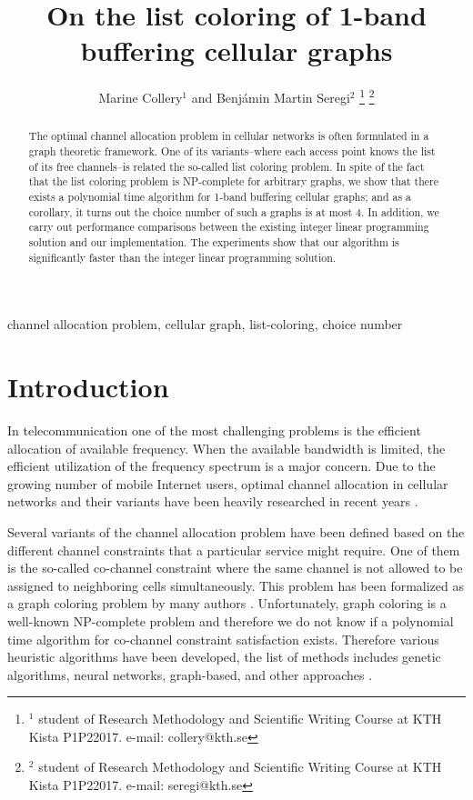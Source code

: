 \documentclass[letterpaper, 10 pt, conference]{ieeeconf}  %
\title{\LARGE \bf
On the list coloring of 1-band buffering cellular graphs
}
\author{Marine Collery$^{1}$ and Benjámin Martin Seregi$^{2}$%
\thanks{$^{1}$ student of Research Methodology and Scientific Writing Course at KTH Kista P1P22017. e-mail: collery@kth.se}%
\thanks{$^{2}$ student of Research Methodology and Scientific Writing Course at KTH Kista P1P22017. e-mail: seregi@kth.se}%
}
\begin{document}
\maketitle
\thispagestyle{firstpage}
\pagestyle{plain}
\cfoot{\thepage}

\begin{abstract}
The optimal channel allocation problem in cellular networks is often formulated in a graph theoretic framework. One of its variants\---where each access point knows the list of its free channels\---is related the so-called list coloring problem. In spite of the fact that the list coloring problem is NP-complete for arbitrary graphs, we show that there exists a polynomial time algorithm for 1-band buffering cellular graphs; and as a corollary, it turns out the choice number of such a graphs is at most 4. In addition, we carry out performance comparisons between the existing integer linear programming solution and our implementation. The experiments show that our algorithm is significantly faster than the integer linear programming solution.
\end{abstract}

\begin{keywords}
channel allocation problem, cellular graph, list-coloring, choice number
\end{keywords}

\section{Introduction}
In telecommunication one of the most challenging problems is the efficient allocation of available frequency. When the available bandwidth is limited, the efficient utilization of the frequency spectrum is a major concern. Due to the growing number of mobile Internet users, optimal channel allocation in cellular networks and their variants have been heavily researched in recent years \cite{Audhya:2011:SCA:1988563.1988571}.

Several variants of the channel allocation problem have been defined based on the different channel constraints that a particular service might require. One of them is the so-called co-channel constraint where the same channel is not allowed to be assigned to neighboring cells simultaneously. This problem has been formalized as a graph coloring problem by many authors \cite{1456167}. Unfortunately, graph coloring is a well-known NP-complete problem \cite{Kar72} and therefore we do not know if a polynomial time algorithm for co-channel constraint satisfaction exists. Therefore various heuristic algorithms have been developed, the list of methods includes genetic algorithms, neural networks, graph-based, and other approaches \cite{Audhya:2011:SCA:1988563.1988571}.
\end{document}
